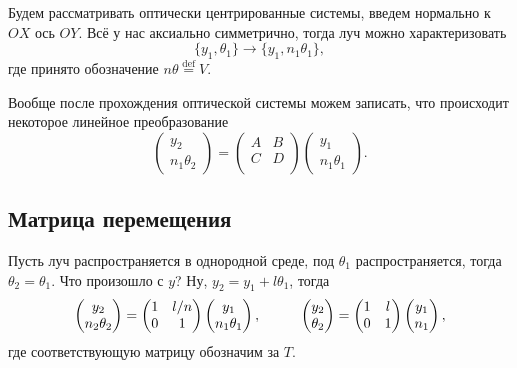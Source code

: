 Будем рассматривать оптически центрированные системы, введем нормально к $OX$ ось $OY$. Всё у нас аксиально симметрично, тогда луч можно характеризовать
\begin{equation*}
    \{y_1, \theta_1\} \to 
    \{y_1, n_1 \theta_1\},
\end{equation*}
где принято обозначение $n \theta \overset{\mathrm{def}}{=} V$.

Вообще после прохождения оптической системы можем записать, что происходит некоторое линейное преобразование
\begin{equation*}
    \begin{pmatrix}
        y_2 \\ n_1 \theta_2
    \end{pmatrix} = 
    \begin{pmatrix}
        A & B \\
        C & D \\
    \end{pmatrix}
    \begin{pmatrix}
        y_1 \\ n_1 \theta_1
    \end{pmatrix}.
\end{equation*}


\subsection{Матрица перемещения}

Пусть луч распространяется в однородной среде, под $\theta_1$ распространяется, тогда $\theta_2 = \theta_1$. Что произошло с $y$? Ну, $y_2 = y_1 + l \theta_1$, тогда
\begin{equation}
    \begin{pmatrix}
        y_2 \\ n_2 \theta_2
    \end{pmatrix} = 
    \begin{pmatrix}
        1 & l/n \\
        0 & 1 \\
    \end{pmatrix} 
    \begin{pmatrix}
        y_1 \\ n_1 \theta_1 
    \end{pmatrix},
    \hspace{1 cm}
    \begin{pmatrix}
        y_2 \\ \theta_2
    \end{pmatrix} = 
    \begin{pmatrix}
        1 & l \\
        0 & 1 \\
    \end{pmatrix} 
    \begin{pmatrix}
        y_1 \\ n_1 
    \end{pmatrix}, 
\end{equation}
где соответствующую матрицу обозначим за $T$. 


